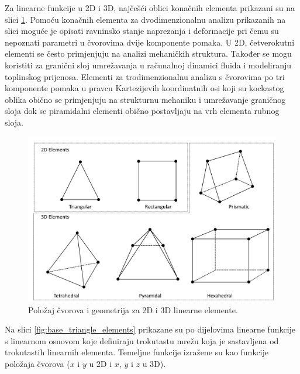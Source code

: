 \documentclass[a4paper,twoside,12pt]{memoir} %
\begin{document}
Za linearne funkcije u 2D i 3D, najčešći oblici konačnih elementa prikazani su na slici \ref{fig:2d_i_3d_elementi}. Pomoću konačnih elementa za dvodimenzionalnu analizu prikazanih na slici moguće je opisati ravninsko stanje naprezanja i deformacije pri čemu su nepoznati parametri u čvorovima dvije komponente pomaka. U 2D, četverokutni elementi se često primjenjuju na analizi mehaničkih struktura. Također se mogu koristiti za granični sloj umrežavanja u računalnoj dinamici fluida i modeliranju toplinskog prijenosa. Elementi za trodimenzionalnu analizu s čvorovima po tri komponente pomaka u pravcu Kartezijevih koordinatnih osi koji su kockastog oblika obično se primjenjuju na strukturnu mehaniku i umrežavanje graničnog sloja dok se piramidalni elementi obično postavljaju na vrh elementa rubnog sloja.

\begin{figure}[h!t]
\begin{center}
\includegraphics[scale=0.47]{pictures/chapter_fem/geometry-and-nodes-linear-elements.png}
\caption{Položaj čvorova i geometrija za 2D i 3D linearne elemente. \cite{comsol_fem_general}}
\label{fig:2d_i_3d_elementi}
\end{center}
\end{figure}

Na slici \ref{fig:base_triangle_elements} prikazane su po dijelovima linearne funkcije s linearnom osnovom koje definiraju trokutastu mrežu koja je sastavljena od trokutastih linearnih elementa. Temeljne funkcije izražene su kao funkcije položaja čvorova ($x$ i $y$ u 2D i $x$, $y$ i $z$ u 3D).
\end{document}
